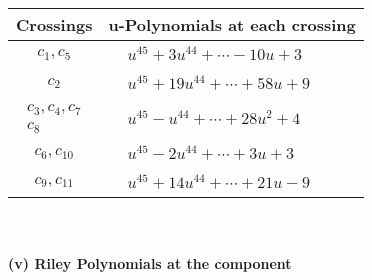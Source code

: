 \documentclass[1p]{elsarticle_modified}
\theoremstyle{definition}
\begin{document}
\begin{tabular}{m{50pt}|m{274pt}}
Crossings & \hspace{64pt}u-Polynomials at each crossing \\
\hline $$\begin{aligned}c_{1},c_{5}\end{aligned}$$&$\begin{aligned}
&u^{45}+3 u^{44}+\cdots-10 u+3
\end{aligned}$\\
\hline $$\begin{aligned}c_{2}\end{aligned}$$&$\begin{aligned}
&u^{45}+19 u^{44}+\cdots+58 u+9
\end{aligned}$\\
\hline $$\begin{aligned}c_{3},c_{4},c_{7}\\c_{8}\end{aligned}$$&$\begin{aligned}
&u^{45}- u^{44}+\cdots+28 u^2+4
\end{aligned}$\\
\hline $$\begin{aligned}c_{6},c_{10}\end{aligned}$$&$\begin{aligned}
&u^{45}-2 u^{44}+\cdots+3 u+3
\end{aligned}$\\
\hline $$\begin{aligned}c_{9},c_{11}\end{aligned}$$&$\begin{aligned}
&u^{45}+14 u^{44}+\cdots+21 u-9
\end{aligned}$\\
\hline
\end{tabular}\\~\\
\newpage\renewcommand{\arraystretch}{1}
\flushleft \textbf{(v) Riley Polynomials at the component}\newline \\
\end{document}
